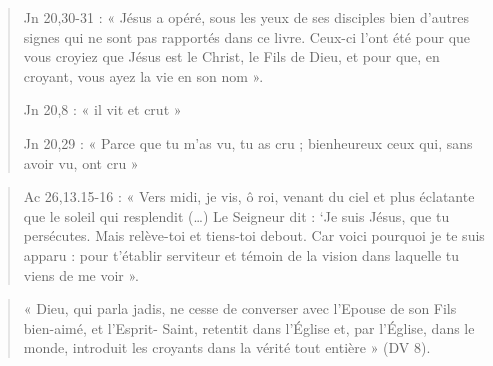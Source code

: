 \begin{quote}
    Jn 20,30-31 : « Jésus a opéré, sous les yeux de ses disciples bien
d'autres signes qui ne sont pas rapportés dans ce livre. Ceux-ci l'ont
été pour que vous croyiez que Jésus est le Christ, le Fils de Dieu, et
pour que, en croyant, vous ayez la vie en son nom ».

Jn 20,8 : « il vit et crut »

Jn 20,29 : « Parce que tu m'as vu, tu as cru ; bienheureux ceux qui,
sans avoir vu, ont cru »
\end{quote}



\begin{quote}
   Ac 26,13.15-16 : « Vers midi, je vis, ô roi, venant du ciel et plus
éclatante que le soleil qui resplendit (\ldots) Le Seigneur dit : `Je
suis Jésus, que tu persécutes. Mais relève-toi et tiens-toi debout. Car
voici pourquoi je te suis apparu : pour t'établir serviteur et témoin de
la vision dans laquelle tu viens de me voir ». 
\end{quote}

\begin{quote}
    « Dieu, qui parla jadis, ne cesse de converser avec l'Epouse de son Fils
bien-aimé, et l'Esprit- Saint, retentit dans l'Église et, par l'Église,
dans le monde, introduit les croyants dans la vérité tout entière » (DV
8).
\end{quote}


